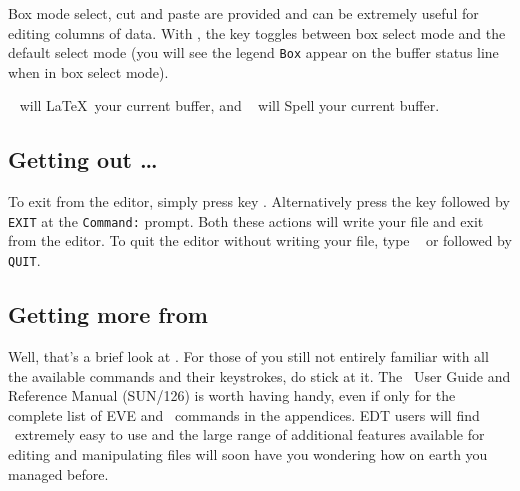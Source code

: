Box mode select, cut and paste are provided and can be extremely useful for
editing columns of data. With \STEve, the  key toggles between box
select mode and the default select mode (you will see the legend {\tt Box}
appear on the buffer status line when in box select mode).

\  will \LaTeX\ your current buffer, and \gold\
 will Spell your current buffer.

\subsection*{Getting out \ldots}
To exit from the editor, simply press key . Alternatively press
the \keyname{Do} key followed by {\tt EXIT} at the {\tt Command:} prompt. Both
these actions will write your file and exit from the editor. To quit the editor
without writing your file, type \gold\ \keyname{Q} or \keyname{Do} followed
by {\tt QUIT}.

\subsection*{Getting more from \STEve}
Well, that's a brief look at \STEve. For those of you still not entirely
familiar with all the available commands and their keystrokes, do stick at it.
The \STEve\ User Guide and Reference Manual (SUN/126) is worth having handy,
even if only for the complete list of EVE and \STEve\ commands in the
appendices. EDT users will find \STEve\ extremely easy to use and the large
range of additional features available for editing and manipulating files will
soon have you wondering how on earth you managed before.


